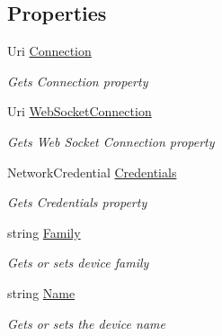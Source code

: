 \subsection*{Properties}
\begin{DoxyCompactItemize}
\item 
Uri \hyperlink{class_mock_data_generator_1_1_device_portal_connection_ad5d1380106469fa0820e0c00d27c28b4}{Connection}
\begin{DoxyCompactList}\small\item\em Gets Connection property \end{DoxyCompactList}\item 
Uri \hyperlink{class_mock_data_generator_1_1_device_portal_connection_a73ce316c04e2eb3c26677441bf832c59}{Web\+Socket\+Connection}
\begin{DoxyCompactList}\small\item\em Gets Web Socket Connection property \end{DoxyCompactList}\item 
Network\+Credential \hyperlink{class_mock_data_generator_1_1_device_portal_connection_a4b2457f7f387ed972ef9fa0972b93620}{Credentials}
\begin{DoxyCompactList}\small\item\em Gets Credentials property \end{DoxyCompactList}\item 
string \hyperlink{class_mock_data_generator_1_1_device_portal_connection_a935715a8687237215e1e02816a4d462f}{Family}
\begin{DoxyCompactList}\small\item\em Gets or sets device family \end{DoxyCompactList}\item 
string \hyperlink{class_mock_data_generator_1_1_device_portal_connection_acbc0ae9350c1884781fa94c9db7a51d6}{Name}
\begin{DoxyCompactList}\small\item\em Gets or sets the device name \end{DoxyCompactList}\item 

\end{DoxyCompactItemize}
